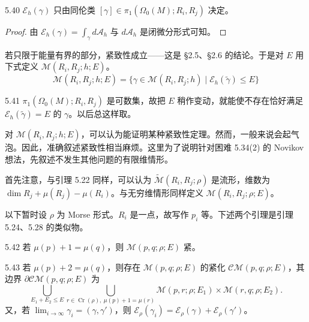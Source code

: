\begin{lemma*}{5.40}
  $\mathcal{E}_h(\gamma)$ 只由同伦类 $[\gamma]\in\pi_1(\Omega_0(M);R_i,R_j)$ 决定。
\end{lemma*}

\begin{proof}
  由 $\mathcal{E}_h(\gamma)=\int_\gamma d\mathcal{A}_h$ 与 $d\mathcal{A}_h$ 是闭微分形式可知。
\end{proof}


若只限于能量有界的部分，紧致性成立——这是 §2.5、§2.6 的结论。于是对 $E$ 用下式定义 $\mathcal{M}(R_i,R_j;h;E)$。
\[
  \mathcal{M}(R_i,R_j;h;E)=\{\gamma\in\mathcal{M}(R_i,R_j;h)\mid\mathcal{E}_h(\tilde\gamma)\le E\}
\]

\begin{remark}{5.41}
  $\pi_1(\Omega_0(M);R_i,R_j)$ 是可数集，故把 $E$ 稍作变动，就能使不存在恰好满足 $\mathcal{E}_h(\tilde\gamma)=E$ 的 $\gamma$。以后总这样取。
\end{remark}

对 $\mathcal{M}(R_i,R_j;h;E)$，可以认为能证明某种紧致性定理。然而，一般来说会起气泡。因此，准确叙述紧致性相当麻烦。这里为了说明针对困难 5.34(2) 的 Novikov 想法，先叙述不发生其他问题的有限维情形。

首先注意，与引理 5.22 同样，可以认为 $\tilde{\mathcal{M}}(R_i,R_j;\rho)$ 是流形，维数为 $\dim R_j+\mu(R_j)-\mu(R_i)$。与无穷维情形同样定义 $\mathcal{M}(R_i,R_j;\rho;E)$。

以下暂时设 $\rho$ 为 Morse 形式。$R_i$ 是一点，故写作 $p_i$ 等。下述两个引理是引理 5.24、5.28 的类似物。

\begin{lemma}{5.42}
  若 $\mu(p)+1=\mu(q)$，则 $\mathcal{M}(p,q;\rho;E)$ 紧。
\end{lemma}

\begin{lemma}{5.43}
  若 $\mu(p)+2=\mu(q)$，则存在 $\mathcal{M}(p,q;\rho;E)$ 的紧化 $\mathcal{CM}(p,q;\rho;E)$，其边界 $\partial\mathcal{CM}(p,q;\rho;E)$ 为
  \[
    \bigcup_{E_1+E_2\le E}\bigcup_{r\in\operatorname{Cr}(\rho),\ \mu(p)+1=\mu(r)}
    \mathcal{M}(p,r;\rho;E_1)\times\mathcal{M}(r,q;\rho;E_2).
  \]
  又，若 $\lim_{i\to\infty}\gamma_i=(\gamma,\gamma')$，则 $\mathcal{E}_\rho(\gamma_i)=\mathcal{E}_\rho(\gamma)+\mathcal{E}_\rho(\gamma')$。
\end{lemma}

